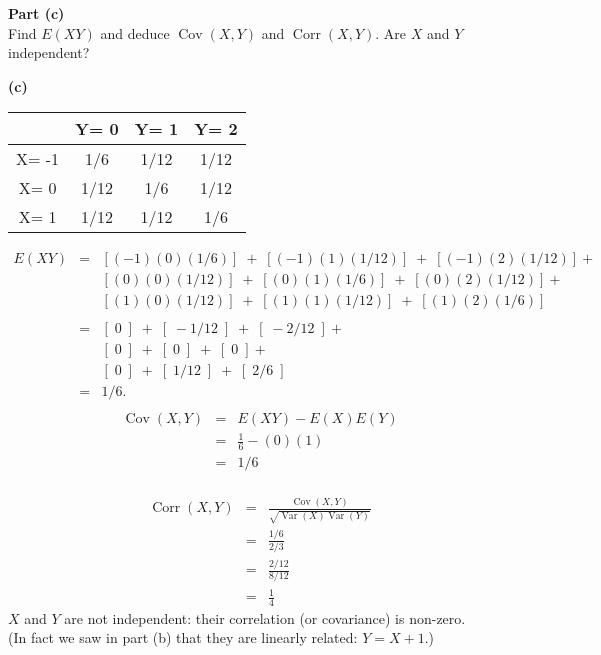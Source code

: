 \documentclass[a4paper,12pt]{article}
\begin{document}
	\newpage
	\large
	\begin{framed}
		\noindent \textbf{Part (c)}\\ Find $E(XY)$ and deduce $\operatorname{Cov}(X, Y)$ and $\operatorname{Corr}(X, Y)$. Are $X$ and $Y$ independent?
	\end{framed}
	\noindent \textbf{(c)}\\
	\large
	\begin{center}
		\begin{tabular}{|c|c|c|c|}\hline 
			& Y= 0    & Y= 1    & Y= 2        \\ \hline \hline 
			X= -1 & 1/6  & 1/12 & 1/12  \\ \hline 
			X=  0 & 1/12 & 1/6  & 1/12  \\ \hline 
			X=  1 & 1/12 & 1/12 & 1/6  \\ \hline 
			
		\end{tabular}
	\end{center}
	\begin{eqnarray*} 
		E(XY) &=& \left[(-1)(0)(1/6)\right] \; + \; \left[(-1)(1)(1/12)\right] \; + \; \left[(-1)(2)(1/12)\right] + 
		\\ & & \left[(0)(0)(1/12)\right] \; + \; \left[(0)(1)(1/6)\right] \; + \;  \left[(0)(2)(1/12)\right] + 
		\\ & &\left[(1)(0)(1/12)\right] \; + \; \left[(1)(1)(1/12)\right] \; + \; \left[(1)(2)(1/6)\right]
		\\ & & \\
		&=& \left[\; 0\;\right] \; + \; \left[\;-1/12\;\right] \; + \; \left[\;-2/12\;\right] + 
		\\ & &  \left[\; 0\;\right] \; + \; \left[\; 0\;\right] \; + \;  \left[\; 0\;\right] + 
		\\ & &\left[\; 0\;\right] \; + \; \left[\;1/12\;\right] \; + \; \left[\;2/6\;\right]
		\\ &=&  1/6.\\
	\end{eqnarray*}
	\begin{eqnarray*}
		\operatorname{Cov}(X, Y) &=& E(XY) - E(X)E(Y) \\ 
		&=& \frac{1}{6} - (0)(1) \\ &=& 1/6\\
	\end{eqnarray*}
	
	\begin{eqnarray*}\operatorname{Corr}(X, Y) &=& \frac{\operatorname{Cov}(X, Y)}{\sqrt{ \operatorname{Var}(X) \operatorname{Var}(Y)}}
		\\ &=& \frac{1/6}{2/3} \\ &=& \frac{2/12}{8/12} 
		\\ &=& \frac{1}{4}
	\end{eqnarray*}
	$X$ and $Y$ are not independent: their correlation (or covariance) is non-zero.\\ \medskip (In fact we
	saw in part (b) that they are linearly related: $Y = X + 1$.)
	
\end{document}

